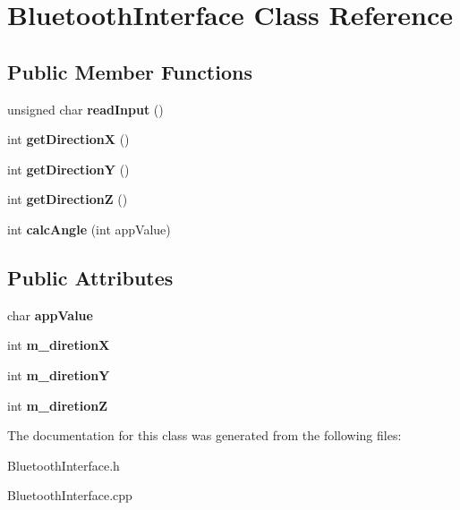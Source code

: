 \hypertarget{class_bluetooth_interface}{}\section{Bluetooth\+Interface Class Reference}
\label{class_bluetooth_interface}
\subsection*{Public Member Functions}
\begin{DoxyCompactItemize}
\item 
\mbox{\label{class_bluetooth_interface_a4ae2135ffda7217b3ee6b2c446eed6db}} 
unsigned char {\bfseries read\+Input} ()
\item 
\mbox{\label{class_bluetooth_interface_a54f6e0ae1122c5efc2f08873b4ec1100}} 
int {\bfseries get\+DirectionX} ()
\item 
\mbox{\label{class_bluetooth_interface_aeb5f167f9ea6e4c114ebe8a608d40ba0}} 
int {\bfseries get\+DirectionY} ()
\item 
\mbox{\label{class_bluetooth_interface_a0c6f6b97c385a336187de2b02a08e754}} 
int {\bfseries get\+DirectionZ} ()
\item 
\mbox{\label{class_bluetooth_interface_a547308ab89e836ccb290ac821b538320}} 
int {\bfseries calc\+Angle} (int app\+Value)
\end{DoxyCompactItemize}
\subsection*{Public Attributes}
\begin{DoxyCompactItemize}
\item 
\mbox{\label{class_bluetooth_interface_aa8abc129f546e58e0cd8f9e88db61802}} 
char {\bfseries app\+Value}
\item 
\mbox{\label{class_bluetooth_interface_ac97f1946092309df55a13162e095e964}} 
int {\bfseries m\+\_\+diretionX}
\item 
\mbox{\label{class_bluetooth_interface_a70250fa08d5535491e24bf629aa8dc5a}} 
int {\bfseries m\+\_\+diretionY}
\item 
\mbox{\label{class_bluetooth_interface_ab5c2891fdaaa0a292ce20d8e58fd4ea2}} 
int {\bfseries m\+\_\+diretionZ}
\end{DoxyCompactItemize}


The documentation for this class was generated from the following files\+:\begin{DoxyCompactItemize}
\item 
Bluetooth\+Interface.\+h\item 
Bluetooth\+Interface.\+cpp\end{DoxyCompactItemize}
